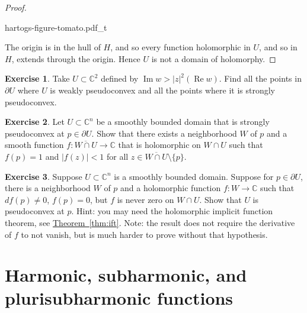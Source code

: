 \documentclass[12pt,openany]{book}
\renewcommand{\Re}{\operatorname{Re}}
\renewcommand{\Im}{\operatorname{Im}}
\newcommand{\sabs}[1]{\lvert {#1} \rvert}
\newcommand{\C}{{\mathbb{C}}}
\theoremstyle{plain}
\theoremstyle{remark}
\theoremstyle{definition}
\newenvironment{exbox}{%
    \def\FrameCommand{\vrule width 1pt \relax\hspace {10pt}}%
    \MakeFramed {\advance \hsize -\width \FrameRestore }%
}{%
    \endMakeFramed
}
\theoremstyle{exercise}
\newtheorem{exercise}{Exercise}[section]
\theoremstyle{example}
\newcommand{\thmref}[1]{\hyperref[#1]{Theorem~\ref*{#1}}}
\begin{document}
\begin{proof}
\begin{center}
{hartogs-figure-tomato.pdf_t}
\end{center}

The origin is in the hull of $H$, and so
every function holomorphic in $U$, and so in $H$, extends through the origin.
Hence $U$ is not a domain of holomorphy.
\end{proof}

\begin{exbox}
\begin{exercise}
Take $U \subset \C^2$ defined by $\Im w > \sabs{z}^2(\Re w)$.  Find all the
points in $\partial U$ where $U$ is weakly pseudoconvex and all the points
where it is strongly pseudoconvex.
\end{exercise}

\begin{exercise}
Let $U \subset \C^n$ be a smoothly bounded domain that is
strongly pseudoconvex at $p \in \partial U$.  Show that there
exists a neighborhood $W$ of $p$ and a smooth function $f \colon
\overline{W \cap U} \to \C$ that is holomorphic on $W \cap U$
such that $f(p)=1$ and $\sabs{f(z)} < 1$ for all
$z \in \overline{W \cap U} \setminus \{ p \}$.
\end{exercise}

\begin{exercise}
Suppose $U \subset \C^n$ is a smoothly bounded domain.  Suppose
for $p \in \partial U$, there is a neighborhood $W$ of $p$
and a holomorphic function $f \colon W \to
\C$ such that $df(p) \not= 0$, $f(p) = 0$, but
$f$ is never zero on $W \cap U$.  Show that $U$ is pseudoconvex
at $p$.  Hint: you may need the holomorphic implicit function theorem, see
\thmref{thm:ift}.
Note: the result does not require the derivative of $f$ to not vanish, but is
much harder to prove without that hypothesis.
\end{exercise}
\end{exbox}


\section{Harmonic, subharmonic, and plurisubharmonic functions}

\end{document}
